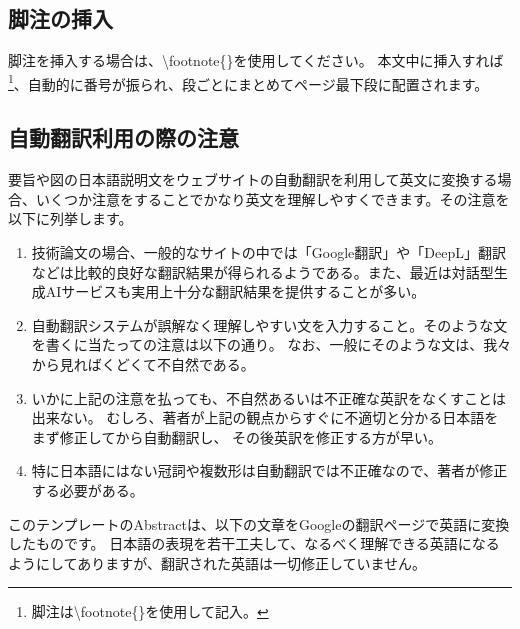 \documentclass{PASJ2026}
\begin{document}
\subsection{脚注の挿入}
脚注を挿入する場合は、\textbackslash{footnote}\{\}を使用してください。
本文中に挿入すれば\footnote{脚注は\textbackslash{footnote}\{\}を使用して記入。}、自動的に番号が振られ、段ごとにまとめてページ最下段に配置されます。
%
\subsection{自動翻訳利用の際の注意}
\label{honyaku}
要旨や図の日本語説明文をウェブサイトの自動翻訳を利用して英文に変換する場合、いくつか注意をすることでかなり英文を理解しやすくできます。その注意を以下に列挙します。
%
\begin{enumerate}
%
\item{技術論文の場合、一般的なサイトの中では「Google翻訳」や「DeepL」翻訳などは比較的良好な翻訳結果が得られるようである。また、最近は対話型生成AIサービスも実用上十分な翻訳結果を提供することが多い。}
%
\item{自動翻訳システムが誤解なく理解しやすい文を入力すること。そのような文を書くに当たっての注意は以下の通り。
なお、一般にそのような文は、我々から見ればくどくて不自然である。}
%
\item{いかに上記の注意を払っても、不自然あるいは不正確な英訳をなくすことは出来ない。
むしろ、著者が上記の観点からすぐに不適切と分かる日本語をまず修正してから自動翻訳し、
その後英訳を修正する方が早い。}
%
\item{特に日本語にはない冠詞や複数形は自動翻訳では不正確なので、著者が修正する必要がある。}
%
\end{enumerate}

このテンプレートのAbstractは、以下の文章をGoogleの翻訳ページで英語に変換したものです。
日本語の表現を若干工夫して、なるべく理解できる英語になるようにしてありますが、翻訳された英語は一切修正していません。
\end{document}
